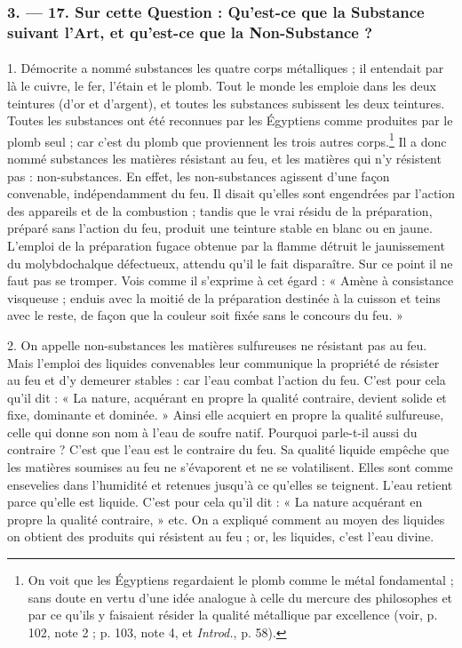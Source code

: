 \documentclass[a4paper, 11pt, oneside, polutonikogreek, french]{article}
\begin{document}
\bigskip
\centerline{\EightStarTaper}
\centerline{\EightStarTaper\EightStarTaper}
\bigskip

\subsubsection{3. --- 17. Sur cette Question : Qu'est-ce que la Substance suivant l'Art, et qu'est-ce que la Non-Substance ?}
\paragraph{}
1. Démocrite a nommé substances les quatre corps métalliques ; il entendait par là le cuivre, le fer, l'étain et le plomb. Tout le monde les emploie dans les deux teintures (d'or et d'argent), et toutes les substances subissent les deux teintures. Toutes les substances ont été reconnues par les Égyptiens comme produites par le plomb seul ; car c'est du plomb que proviennent les trois autres corps.\footnote{On voit que les Égyptiens regardaient le plomb comme le métal fondamental ; sans doute en vertu d'une idée analogue à celle du mercure des philosophes et par ce qu'ils y faisaient résider la qualité métallique par excellence (voir, p. 102, note 2 ; p. 103, note 4, et \emph{Introd.}, p. 58).} Il a donc nommé substances les matières résistant au feu, et les matières qui n'y résistent pas : non-substances. En effet, les non-substances agissent d'une façon convenable, indépendamment du feu. Il disait qu'elles sont engendrées par l'action des appareils et de la combustion ; tandis que le vrai résidu de la préparation, préparé sans l'action du feu, produit une teinture stable en blanc ou en jaune. L'emploi de la préparation fugace obtenue par la flamme détruit le jaunissement du molybdochalque défectueux, attendu qu'il le fait disparaître. Sur ce point il ne faut pas se tromper. Vois comme il s'exprime à cet égard : « Amène à consistance visqueuse ; enduis avec la moitié de la préparation destinée à la cuisson et teins avec le reste, de façon que la couleur soit fixée sans le concours du feu. »

2. On appelle non-substances les matières sulfureuses ne résistant pas au feu. Mais l'emploi des liquides convenables leur communique la propriété de résister au feu et d'y demeurer stables : car l'eau combat l'action du feu. C'est pour cela qu'il dit : « La nature, acquérant en propre la qualité contraire, devient solide et fixe, dominante et dominée. » Ainsi elle acquiert en propre la qualité sulfureuse, celle qui donne son nom à l'eau de soufre natif. Pourquoi parle-t-il aussi du contraire ? C'est que l'eau est le contraire du feu. Sa qualité liquide empêche que les matières soumises au feu ne s'évaporent et ne se volatilisent. Elles sont comme ensevelies dans l'humidité et retenues jusqu'à ce qu'elles se teignent. L'eau retient parce qu'elle est liquide. C'est pour cela qu'il dit : « La nature acquérant en propre la qualité contraire, » etc. On a expliqué comment au moyen des liquides on obtient des produits qui résistent au feu ; or, les liquides, c'est l'eau divine.
\end{document}
